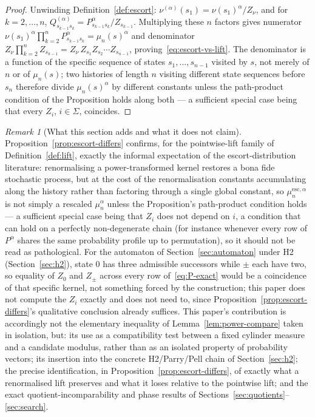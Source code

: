 \documentclass[11pt,a4paper]{article}
\theoremstyle{definition}
\theoremstyle{remark}
\newtheorem{remark}[theorem]{Remark}
\newcommand{\Sh}{\Sigma}
\begin{document}
\begin{proof}
  Unwinding Definition~\ref{def:escort}: $\nu^{(\alpha)}(s_1) = \nu(s_1)^\alpha /
  Z_\nu$, and for $k=2,\dots,n$, $Q^{(\alpha)}_{s_{k-1}s_k} =
  P_{s_{k-1}s_k}^\alpha / Z_{s_{k-1}}$. Multiplying these $n$ factors gives numerator
  $\nu(s_1)^\alpha \prod_{k=2}^n P_{s_{k-1}s_k}^\alpha = \mu_n(s)^\alpha$ and
  denominator $Z_\nu \prod_{k=2}^{n} Z_{s_{k-1}} = Z_\nu\, Z_{s_1} Z_{s_2}
  \cdots Z_{s_{n-1}}$, proving~\eqref{eq:escort-vs-lift}. The denominator is a function
  of the specific sequence of states $s_1,\dots,s_{n-1}$ visited by $s$, not merely of
  $n$ or of $\mu_n(s)$; two histories of length $n$ visiting different state sequences
  before $s_n$ therefore divide $\mu_n(s)^\alpha$ by different constants unless the
  path-product condition of the Proposition holds along both --- a sufficient special
  case being that every $Z_i$, $i\in\Sh$, coincides.
\end{proof}

\begin{remark}[What this section adds and what it does not claim]
  \label{rem:escort-novelty}
  Proposition~\ref{prop:escort-differs} confirms, for the pointwise-lift family of
  Definition~\ref{def:lift}, exactly the informal expectation of the escort-distribution
  literature: renormalising a power-transformed kernel restores a bona fide stochastic
  process, but at the cost of the renormalisation constants accumulating along the
  history rather than factoring through a single global constant, so
  $\mu_n^{\mathrm{esc},\alpha}$ is not simply a rescaled $\mu_n^\alpha$ unless the
  Proposition's path-product condition holds --- a sufficient special case being that
  $Z_i$ does not depend on $i$, a condition that can hold on a perfectly non-degenerate
  chain (for instance whenever every row of $P^\alpha$ shares the same probability
  profile up to permutation), so it should not be read as pathological. For the
  automaton of Section~\ref{sec:automaton} under \textup{H2}
  (Section~\ref{sec:h2}), state $0$ has three admissible successors while $\pm$ each
  have two, so equality of $Z_0$ and $Z_{\pm}$ across every row of~\eqref{eq:P-exact}
  would be a coincidence of that specific kernel, not something forced by the
  construction; this paper does not compute
  the $Z_i$ exactly and does not need to, since Proposition~\ref{prop:escort-differs}'s
  qualitative conclusion already suffices. This paper's contribution is accordingly not
  the elementary inequality of Lemma~\ref{lem:power-compare} taken in isolation, but:
  its use as a compatibility test between a fixed cylinder measure and a candidate
  modulus, rather than as an isolated property of probability vectors; its insertion
  into the concrete \textup{H2}/Parry/Pell chain of Section~\ref{sec:h2}; the precise
  identification, in Proposition~\ref{prop:escort-differs}, of exactly what a
  renormalised lift preserves and what it loses relative to the pointwise lift; and the
  exact quotient-incomparability and phase results of
  Sections~\ref{sec:quotients}--\ref{sec:search}.
\end{remark}
\end{document}
